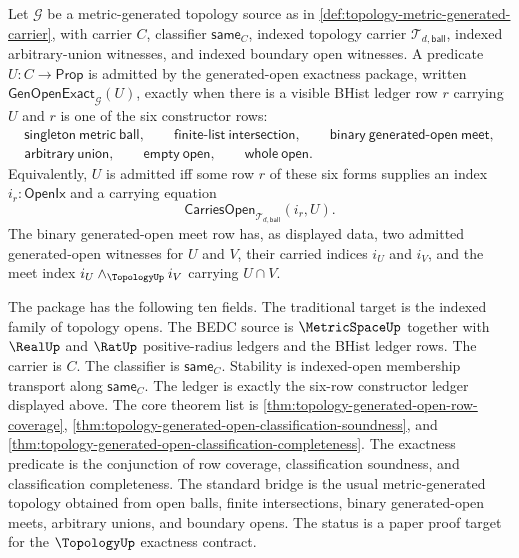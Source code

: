 \begin{definition}
\label{def:topology-generated-open-exactness}
Let $\mathcal{G}$ be a metric-generated topology source as in \autoref{def:topology-metric-generated-carrier}, with carrier $C$, classifier $\mathsf{same}_C$, indexed topology carrier $\mathcal{T}_{d,\mathsf{ball}}$, indexed arbitrary-union witnesses, and indexed boundary open witnesses. A predicate $U:C\to\mathsf{Prop}$ is admitted by the generated-open exactness package, written $\mathsf{GenOpenExact}_{\mathcal{G}}(U)$, exactly when there is a visible BHist ledger row $r$ carrying $U$ and $r$ is one of the six constructor rows:
$$
\begin{gathered}
\mathsf{singleton\ metric\ ball},\qquad
\mathsf{finite\mbox{-}list\ intersection},\qquad
\mathsf{binary\ generated\mbox{-}open\ meet},\\
\mathsf{arbitrary\ union},\qquad
\mathsf{empty\ open},\qquad
\mathsf{whole\ open}.
\end{gathered}
$$
Equivalently, $U$ is admitted iff some row $r$ of these six forms supplies an index $i_r:\mathsf{OpenIx}$ and a carrying equation
$$
\mathsf{CarriesOpen}_{\mathcal{T}_{d,\mathsf{ball}}}(i_r,U).
$$
The binary generated-open meet row has, as displayed data, two admitted generated-open witnesses for $U$ and $V$, their carried indices $i_U$ and $i_V$, and the meet index $i_U\wedge_{\TopologyUp}i_V$ carrying $U\cap V$.

The package has the following ten fields. The traditional target is the indexed family of topology opens. The BEDC source is $\MetricSpaceUp$ together with $\RealUp$ and $\RatUp$ positive-radius ledgers and the BHist ledger rows. The carrier is $C$. The classifier is $\mathsf{same}_C$. Stability is indexed-open membership transport along $\mathsf{same}_C$. The ledger is exactly the six-row constructor ledger displayed above. The core theorem list is \autoref{thm:topology-generated-open-row-coverage}, \autoref{thm:topology-generated-open-classification-soundness}, and \autoref{thm:topology-generated-open-classification-completeness}. The exactness predicate is the conjunction of row coverage, classification soundness, and classification completeness. The standard bridge is the usual metric-generated topology obtained from open balls, finite intersections, binary generated-open meets, arbitrary unions, and boundary opens. The status is a paper proof target for the $\TopologyUp$ exactness contract.
\end{definition}


